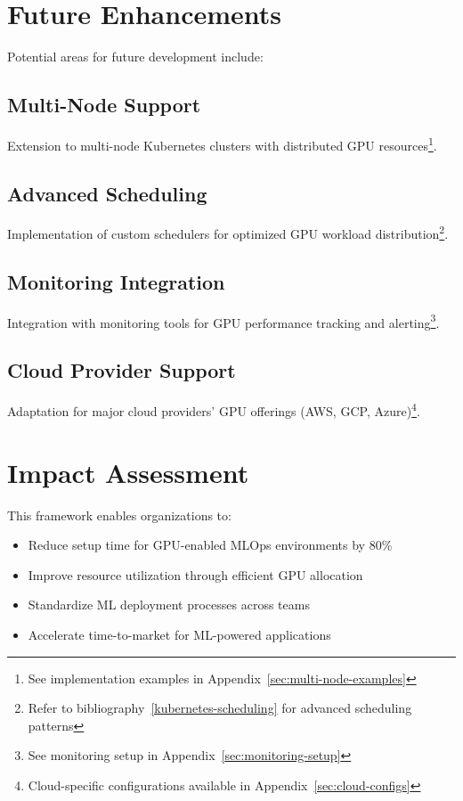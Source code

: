 \documentclass[12pt,a4paper]{report}
\begin{document}
\section{Future Enhancements}
Potential areas for future development include:

\subsection{Multi-Node Support}
Extension to multi-node Kubernetes clusters with distributed GPU resources\footnote{See implementation examples in Appendix~\ref{sec:multi-node-examples}}.

\subsection{Advanced Scheduling}
Implementation of custom schedulers for optimized GPU workload distribution\footnote{Refer to bibliography~\ref{kubernetes-scheduling} for advanced scheduling patterns}.

\subsection{Monitoring Integration}
Integration with monitoring tools for GPU performance tracking and alerting\footnote{See monitoring setup in Appendix~\ref{sec:monitoring-setup}}.

\subsection{Cloud Provider Support}
Adaptation for major cloud providers' GPU offerings (AWS, GCP, Azure)\footnote{Cloud-specific configurations available in Appendix~\ref{sec:cloud-configs}}.

\section{Impact Assessment}
This framework enables organizations to:
\begin{itemize}
    \item Reduce setup time for GPU-enabled MLOps environments by 80\%
    \item Improve resource utilization through efficient GPU allocation
    \item Standardize ML deployment processes across teams
    \item Accelerate time-to-market for ML-powered applications
\end{itemize}
\end{document}
